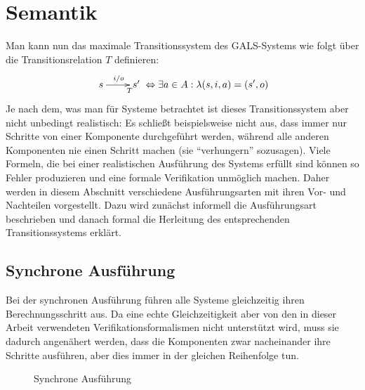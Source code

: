 \section{Semantik}
\label{sec:semantic}
Man kann nun das maximale Transitionssystem des GALS-Systems wie folgt über die Transitionsrelation $T$ definieren:
\[ \xymatrix { s \ar[r]^{i/o}_>T & s' } \Leftrightarrow \exists a\in A: \lambda(s,i,a) = (s',o) \]
Je nach dem, was man für Systeme betrachtet ist dieses Transitionssystem aber nicht unbedingt realistisch:
Es schließt beispielsweise nicht aus, dass immer nur Schritte von einer Komponente durchgeführt werden, während alle anderen Komponenten nie einen Schritt machen (sie "`verhungern"' sozusagen).
Viele Formeln, die bei einer realistischen Ausführung des Systems erfüllt sind können so Fehler produzieren und eine formale Verifikation unmöglich machen.
Daher werden in diesem Abschnitt verschiedene Ausführungsarten mit ihren Vor- und Nachteilen vorgestellt.
Dazu wird zunächst informell die Ausführungsart beschrieben und danach formal die Herleitung des entsprechenden Transitionssystems erklärt.

\subsection{Synchrone Ausführung}
Bei der synchronen Ausführung führen alle Systeme gleichzeitig ihren Berechnungsschritt aus.
Da eine echte Gleichzeitigkeit aber von den in dieser Arbeit verwendeten Verifikationsformalismen nicht unterstützt wird, muss sie dadurch angenähert werden, dass die Komponenten zwar nacheinander ihre Schritte ausführen, aber dies  immer in der gleichen Reihenfolge tun.

\begin{figure}[h]
  \centering
  \caption{Synchrone Ausführung}
  \label{fig:synchronized_execution}
\end{figure}

